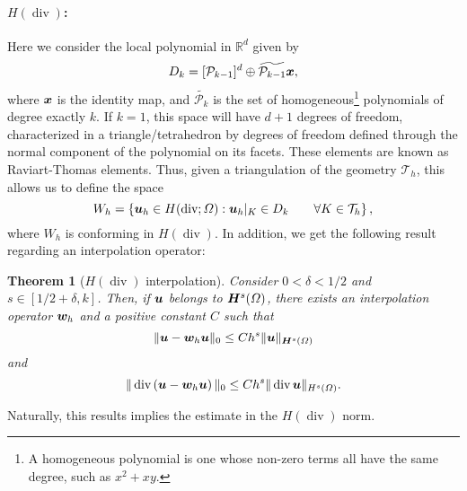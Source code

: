 \documentclass{article}
\renewcommand{\vec}{\vectorsym}
\DeclareMathOperator{\dive}{\text{div}}
\newcommand{\R}{\mathbb{R}}
\newcommand{\T}{\mathcal{T}}
\renewcommand{\P}{\mathcal{P}}
\newtheorem{theorem}{Theorem}
\begin{document}
\paragraph{$H(\dive)$:} Here we consider the local polynomial in $\R^d$ given by
    $$ D_k = [\P_{k-1}]^d \oplus \widetilde{\P_{k-1}} \vec x, $$
where $\vec x$ is the identity map, and $\widetilde{\P_k}$ is the set of homogeneous\footnote{A homogeneous polynomial is one whose non-zero terms all have the same degree, such as $x^2 + xy$.} polynomials of degree exactly $k$. If $k=1$, this space will have $d+1$ degrees of freedom, characterized in a triangle/tetrahedron by degrees of freedom defined through the normal component of the polynomial on its facets. These elements are known as Raviart-Thomas elements. Thus, given a triangulation of the geometry $\T_h$, this allows us to define the space
    $$ W_h = \left\{ \vec u_h \in H(\dive; \Omega):  \vec u_h|_K \in D_k \qquad\forall K \in \T_h \right\}, $$
where $W_h$ is conforming in $H(\dive)$. In addition, we get the following result regarding an interpolation operator: 
    \begin{theorem}[$H(\dive)$ interpolation]
        Consider $0<\delta<1/2$ and $s\in [1/2+\delta, k]$. Then, if $\vec u$ belongs to $\vec H^s(\Omega)$, there exists an interpolation operator $\vec w_h$ and a positive constant $C$ such that
            $$ \|\vec u - \vec w_h \vec u\|_0 \leq C h^s \| \vec u \|_{\vec H^s(\Omega)} $$
        and 
            $$ \|\dive\left(\vec u - \vec w_h \vec u\right)\|_0 \leq C h^s \| \dive \vec u \|_{H^s(\Omega)}. $$
    \end{theorem}
Naturally, this results implies the estimate in the $H(\dive)$ norm. 
\end{document}
